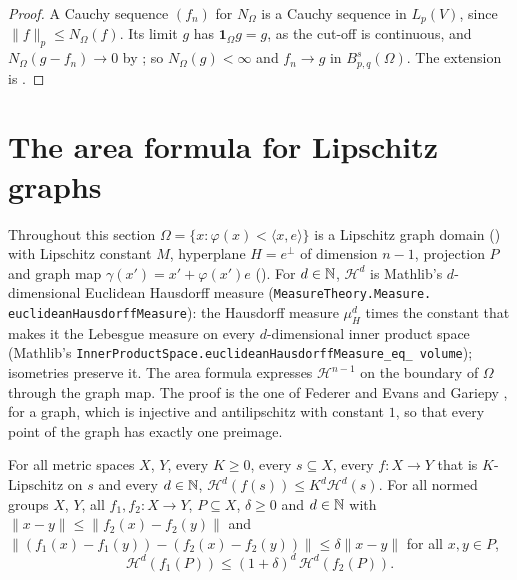 \begin{proof}
\leanok
A Cauchy sequence $(f_n)$ for $N_\Omega$ is a Cauchy sequence in $L_p(V)$, since
$\|f\|_p \leq N_\Omega(f)$. Its limit $g$ has $\mathbf 1_\Omega g = g$, as the cut-off is
continuous, and $N_\Omega(g - f_n) \to 0$ by ; so
$N_\Omega(g) < \infty$ and $f_n \to g$ in $B^s_{p,q}(\Omega)$. The extension is
.
\end{proof}

\section{The area formula for Lipschitz graphs}
\label{sec:lipschitz-graph-area}

Throughout this section $\Omega = \{x : \varphi(x) < \langle x, e \rangle\}$ is a Lipschitz graph
domain () with Lipschitz constant $M$, hyperplane $H = e^\perp$ of
dimension $n - 1$, projection $P$ and graph map $\gamma(x') = x' + \varphi(x') e$
(). For $d \in \mathbb{N}$, $\mathcal H^d$ is Mathlib's $d$-dimensional Euclidean
Hausdorff measure (\texttt{MeasureTheory.\allowbreak Measure.\allowbreak
euclideanHausdorffMeasure}): the Hausdorff measure $\mu_H^d$ times the constant that makes it the
Lebesgue measure on every $d$-dimensional inner product space (Mathlib's
\texttt{InnerProductSpace.\allowbreak euclideanHausdorffMeasure\_\allowbreak eq\_\allowbreak
volume}); isometries preserve it. The area formula expresses $\mathcal H^{n-1}$ on the boundary
of $\Omega$ through the graph map. The proof is the one of Federer
\cite[3.2.3]{Federer} and Evans and Gariepy \cite[Section 3.3]{EvansGariepy}, for a graph, which
is injective and antilipschitz with constant $1$, so that every point of the graph has exactly one
preimage.

\begin{lemma}
\label{lem:hausdorff-lipschitz-image}
\leanok
For all metric spaces $X$, $Y$, every $K \geq 0$, every $s \subseteq X$, every $f : X \to Y$ that
is $K$-Lipschitz on $s$ and every $d \in \mathbb{N}$,
$\mathcal H^d(f(s)) \leq K^d \mathcal H^d(s)$. For all normed groups $X$, $Y$, all
$f_1, f_2 : X \to Y$, $P \subseteq X$, $\delta \geq 0$ and $d \in \mathbb{N}$ with
$\|x - y\| \leq \|f_2(x) - f_2(y)\|$ and
$\|(f_1(x) - f_1(y)) - (f_2(x) - f_2(y))\| \leq \delta \|x - y\|$ for all $x, y \in P$,
\[
  \mathcal H^d(f_1(P)) \leq (1 + \delta)^d \, \mathcal H^d(f_2(P)).
\]
\end{lemma}

